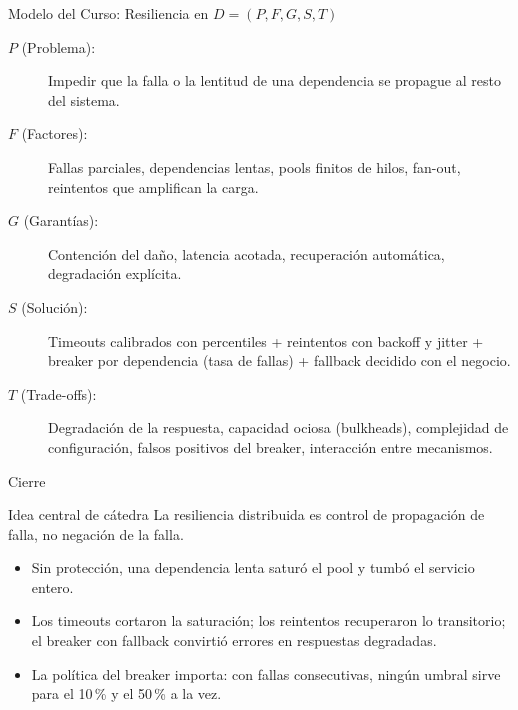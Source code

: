 \documentclass[institutional,screen,none]{ua-engineering-v6-beamer}
\begin{document}
\begin{frame}{Modelo del Curso: Resiliencia en $D = (P, F, G, S, T)$}
\begin{description}
\item[$P$ (Problema):] Impedir que la falla o la lentitud de una dependencia se propague al resto del sistema.
\item[$F$ (Factores):] Fallas parciales, dependencias lentas, pools finitos de hilos, fan-out, reintentos que amplifican la carga.
\item[$G$ (Garantías):] Contención del daño, latencia acotada, recuperación automática, degradación explícita.
\item[$S$ (Solución):] Timeouts calibrados con percentiles + reintentos con backoff y jitter + breaker por dependencia (tasa de fallas) + fallback decidido con el negocio.
\item[$T$ (Trade-offs):] Degradación de la respuesta, capacidad ociosa (bulkheads), complejidad de configuración, falsos positivos del breaker, interacción entre mecanismos.
\end{description}
\end{frame}

\begin{frame}{Cierre}
\begin{block}{Idea central de cátedra}
La resiliencia distribuida es control de propagación de falla, no negación de la falla.
\end{block}

\begin{itemize}
\item Sin protección, una dependencia lenta saturó el pool y tumbó el servicio entero.
\item Los timeouts cortaron la saturación; los reintentos recuperaron lo transitorio; el breaker con fallback convirtió errores en respuestas degradadas.
\item La política del breaker importa: con fallas consecutivas, ningún umbral sirve para el 10\,\% y el 50\,\% a la vez.
\end{itemize}
\end{frame}
\end{document}
